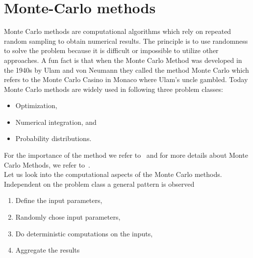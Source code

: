 \chapter{Monte-Carlo methods}
\label{sec:monte:carlo}
Monte Carlo methods are computational algorithms which rely on repeated random sampling to obtain numerical results. The principle is to use randomness to solve the problem because it is difficult or impossible to utilize other approaches. A fun fact is that when the Monte Carlo Method was developed in the 1940s by Ulam and von Neumann they called the method Monte Carlo which refers to the Monte Carlo Casino in Monaco where Ulam's uncle gambled. Today Monte Carlo methods are widely used in following three problem classes:
\begin{itemize}
\item Optimization,
\item Numerical integration, and
\item Probability distributions.
\end{itemize}
For the importance of the method we refer to~\cite{kroese2014monte} and for more details about Monte Carlo Methods, we refer to~\cite{shonkwiler2009explorations}.\\

Let us look into the computational aspects of the Monte Carlo methods. Independent on the problem class a general pattern is observed
\begin{enumerate}
\item Define the input parameters,
\item Randomly chose input parameters,
\item Do deterministic computations on the inputs,
\item Aggregate the results
\end{enumerate}

